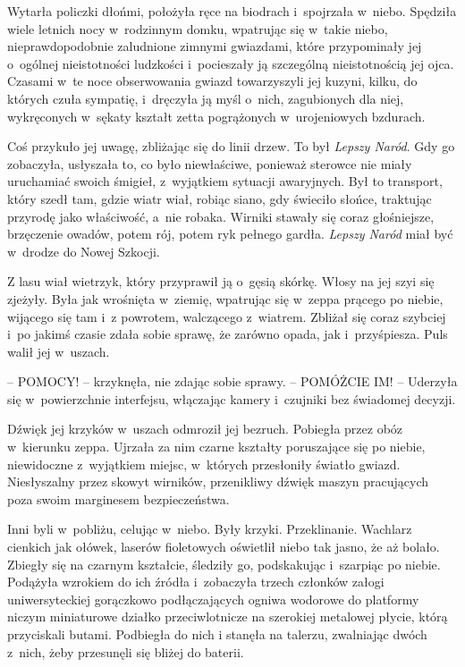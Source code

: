 \documentclass[oneside,polish,11pt,sfheadings]{mwbk}
\begin{document}
Wytarła policzki dłońmi, położyła ręce na biodrach i~spojrzała w~niebo.
Spędziła wiele letnich nocy w~rodzinnym domku, wpatrując się w~takie
niebo, nieprawdopodobnie zaludnione zimnymi gwiazdami, które
przypominały jej o~ogólnej nieistotności ludzkości i~pocieszały ją
szczególną nieistotnością jej ojca. Czasami w~te noce obserwowania
gwiazd towarzyszyli jej kuzyni, kilku, do których czuła sympatię, i~dręczyła ją myśl o~nich, zagubionych dla niej, wykręconych w~sękaty
kształt zetta pogrążonych w~urojeniowych bzdurach.

Coś przykuło jej uwagę, zbliżając się do linii drzew. To był
\textit{Lepszy Naród}. Gdy go zobaczyła, usłyszała to, co było
niewłaściwe, ponieważ sterowce nie miały uruchamiać swoich śmigieł, z~wyjątkiem sytuacji awaryjnych. Był to transport, który szedł tam, gdzie
wiatr wiał, robiąc siano, gdy świeciło słońce, traktując przyrodę jako
właściwość, a~nie robaka. Wirniki stawały się coraz głośniejsze,
brzęczenie owadów, potem rój, potem ryk pełnego gardła. \textit{Lepszy
Naród} miał być w~drodze do Nowej Szkocji.

Z lasu wiał wietrzyk, który przyprawił ją o~gęsią skórkę. Włosy na jej
szyi się zjeżyły. Była jak wrośnięta w~ziemię, wpatrując się w~zeppa
prącego po niebie, wijącego się tam i~z powrotem, walczącego z~wiatrem.
Zbliżał się coraz szybciej i~po jakimś czasie zdała sobie sprawę, że
zarówno opada, jak i~przyśpiesza. Puls walił jej w~uszach.

-- POMOCY! -- krzyknęła, nie zdając sobie sprawy. -- POMÓŻCIE IM! -- Uderzyła się w~powierzchnie interfejsu, włączając kamery i~czujniki bez
świadomej decyzji.

Dźwięk jej krzyków w~uszach odmroził jej bezruch. Pobiegła przez obóz w~kierunku zeppa. Ujrzała za nim czarne kształty poruszające się po
niebie, niewidoczne z~wyjątkiem miejsc, w~których przesłoniły światło
gwiazd. Niesłyszalny przez skowyt wirników, przenikliwy dźwięk maszyn
pracujących poza swoim marginesem bezpieczeństwa.

Inni byli w~pobliżu, celując w~niebo. Były krzyki. Przeklinanie. Wachlarz
cienkich jak ołówek, laserów fioletowych oświetlił niebo tak jasno, że
aż bolało. Zbiegły się na czarnym kształcie, śledziły go, podskakując i~szarpiąc po niebie. Podążyła wzrokiem do ich źródła i~zobaczyła trzech
członków załogi uniwersyteckiej gorączkowo podłączających ogniwa
wodorowe do platformy niczym miniaturowe działko przeciwlotnicze na
szerokiej metalowej płycie, którą przyciskali butami. Podbiegła do nich
i stanęła na talerzu, zwalniając dwóch z~nich, żeby przesunęli się
bliżej do baterii.
\end{document}
